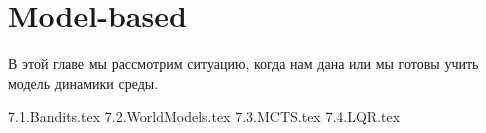 \chapter{Model-based}\label{modelbasedchapter}

В этой главе мы рассмотрим ситуацию, когда нам дана или мы готовы учить модель динамики среды. 

{7.1.Bandits.tex}
{7.2.WorldModels.tex}
{7.3.MCTS.tex}
{7.4.LQR.tex}